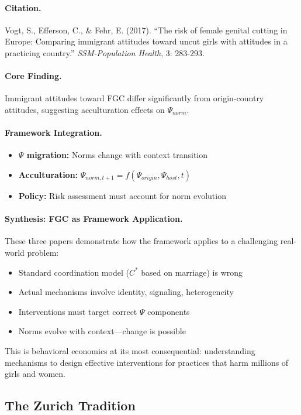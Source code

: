 \documentclass[12pt,a4paper]{article}
\begin{document}
\paragraph{Citation.}
Vogt, S., Efferson, C., \& Fehr, E. (2017).
``The risk of female genital cutting in Europe: Comparing immigrant attitudes
toward uncut girls with attitudes in a practicing country.''
\emph{SSM-Population Health}, 3: 283-293.

\paragraph{Core Finding.}
Immigrant attitudes toward FGC differ significantly from origin-country
attitudes, suggesting acculturation effects on $\Psi_{norm}$.

\paragraph{Framework Integration.}
\begin{itemize}
  \item \textbf{$\Psi$ migration:} Norms change with context transition
  \item \textbf{Acculturation:} $\Psi_{norm,t+1} = f(\Psi_{origin}, \Psi_{host}, t)$
  \item \textbf{Policy:} Risk assessment must account for norm evolution
\end{itemize}

\paragraph{Synthesis: FGC as Framework Application.}
These three papers demonstrate how the framework applies to a challenging
real-world problem:
\begin{itemize}
  \item Standard coordination model ($C^*$ based on marriage) is wrong
  \item Actual mechanisms involve identity, signaling, heterogeneity
  \item Interventions must target correct $\Psi$ components
  \item Norms evolve with context---change is possible
\end{itemize}

This is behavioral economics at its most consequential: understanding
mechanisms to design effective interventions for practices that harm
millions of girls and women.

\subsection{The Zurich Tradition}
\end{document}
